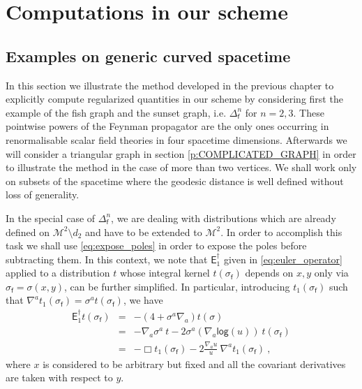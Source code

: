 \documentclass[11pt]{book}
\renewcommand{\log}{\mathsf{log}}
\newcommand{\Mcal}{\mathcal{M}}
\newcommand{\Esf}{\mathsf{E}}
\newcommand{\fsf}{\mathsf{f}}
\theoremstyle{break}
\begin{document}
\chapter{Computations in our scheme}


\section{Examples on generic curved spacetime}


In this section we illustrate the method developed in the previous chapter to explicitly compute regularized quantities in our scheme by considering first the example of the fish graph and the sunset graph, i.e. $\Delta^n_\fsf$ for $n=2,3$. These pointwise powers of the Feynman propagator are the only ones occurring in renormalisable scalar field theories in four spacetime dimensions. Afterwards we will consider a triangular graph in section \ref{p:COMPLICATED_GRAPH} in order to illustrate the method in the case of more than two vertices. We shall work only on subsets of the spacetime where the geodesic distance is well defined without loss of generality.


In the special case of $\Delta^n_\fsf$, we are dealing with distributions which are already defined on $\Mcal^2\setminus d_2$ and have to be extended to $\Mcal^2$. In order to accomplish this task we shall use \eqref{eq:expose_poles} in order to expose the poles before subtracting them. In this context, we note that  $\Esf^\dagger_1$ given in \eqref{eq:euler_operator} applied to a distribution $t$ whose integral kernel $t(\sigma_\fsf)$ depends on $x,y$  only via $\sigma_\fsf = \sigma(x,y)$, can be further simplified. In particular, introducing $t_1(\sigma_\fsf)$ such that $\nabla^a t_1(\sigma_\fsf) = \sigma^a t(\sigma_\fsf)$, we have
%
\begin{eqnarray}
\Esf_1^\dagger t(\sigma_\fsf) &=& -\left( 4 + \sigma^a\nabla_a \right) t(\sigma) \nonumber \\
&=& - \nabla_a \sigma^a \ t - 2 \sigma^a (\nabla_a \log (u)) \ t(\sigma_\fsf) \nonumber \\ 
&=& - \Box t_1(\sigma_\fsf) - 2 \frac{\nabla_a u}{u} \ \nabla^a t_1(\sigma_\fsf) \ , 
\label{eq:E_simplified}
\end{eqnarray}
%
where $x$ is considered to be arbitrary but fixed and all the covariant derivatives are taken with respect to $y$.
\end{document}
